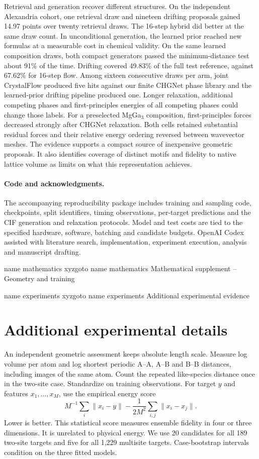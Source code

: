 \documentclass[10pt]{article}
\newcommand{\crytalmark}[2]{\pdfdest name {#1} xyz\pdfoutline goto name {#1} {#2}}
\newcommand{\crytalmark}[2]{\pdfbookmark[1]{#2}{#1}}
\begin{document}
Retrieval and generation recover different structures. On the independent Alexandria cohort, one retrieval draw and nineteen drifting proposals gained 14.97 points over twenty retrieval draws. The 16-step hybrid did better at the same draw count. In unconditional generation, the learned prior reached new formulas at a measurable cost in chemical validity. On the same learned composition draws, both compact generators passed the minimum-distance test about 91\% of the time. Drifting covered 49.83\% of the full test reference, against 67.62\% for 16-step flow. Among sixteen consecutive draws per arm, joint CrystalFlow produced five hits against our finite CHGNet phase library and the learned-prior drifting pipeline produced one. Longer relaxation, additional competing phases and first-principles energies of all competing phases could change those labels. For a preselected MgGa$_3$ composition, first-principles forces decreased strongly after CHGNet relaxation. Both cells retained substantial residual forces and their relative energy ordering reversed between wavevector meshes. The evidence supports a compact source of inexpensive geometric proposals. It also identifies coverage of distinct motifs and fidelity to native lattice volume as limits on what this representation achieves.

\paragraph{Code and acknowledgments.} The accompanying reproducibility package includes training and sampling code, checkpoints, split identifiers, timing observations, per-target predictions and the CIF generation and relaxation protocols. Model and test costs are tied to the specified hardware, software, batching and candidate budgets. OpenAI Codex assisted with literature search, implementation, experiment execution, analysis and manuscript drafting.

\clearpage
\crytalmark{mathematics}{Mathematical supplement -- Geometry and training}

\clearpage
\appendix
\crytalmark{experiments}{Additional experimental evidence}
\section{Additional experimental details}\label{sec:impl}



An independent geometric assessment keeps absolute length scale. Measure log volume per atom and log shortest periodic A--A, A--B and B--B distances, including images of the same atom. Count the repeated like-species distance once in the two-site case. Standardize on training observations. For target $y$ and features $x_1,\ldots,x_M$, use the empirical energy score \cite{energy}
\[
 M^{-1}\sum_i\|x_i-y\|-\frac{1}{2M^2}\sum_{i,j}\|x_i-x_j\|.
\]
Lower is better. This statistical score measures ensemble fidelity in four or three dimensions. It is unrelated to physical energy. We use 20 candidates for all 189 two-site targets and five for all 1,229 multisite targets. Case-bootstrap intervals condition on the three fitted models.
\end{document}
